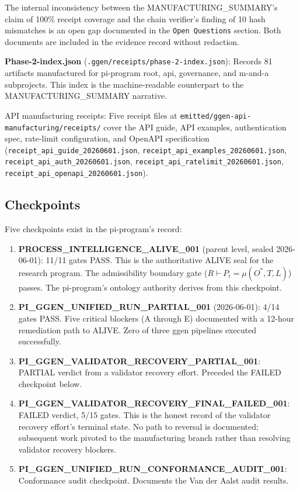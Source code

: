 The internal inconsistency between the MANUFACTURING\_SUMMARY's claim of 100\% receipt coverage and the chain verifier's finding of 10 hash mismatches is an open gap documented in the \texttt{Open Questions} section. Both documents are included in the evidence record without redaction.

\textbf{Phase-2-index.json} (\texttt{.ggen/receipts/phase-2-index.json}): Records 81 artifacts manufactured for pi-program root, api, governance, and m-and-a subprojects. This index is the machine-readable counterpart to the MANUFACTURING\_SUMMARY narrative.

API manufacturing receipts: Five receipt files at \texttt{emitted/ggen-api-manufacturing/receipts/} cover the API guide, API examples, authentication spec, rate-limit configuration, and OpenAPI specification (\texttt{receipt\_api\_guide\_20260601.json}, \texttt{receipt\_api\_examples\_20260601.json}, \texttt{receipt\_api\_auth\_20260601.json}, \texttt{receipt\_api\_ratelimit\_20260601.json}, \texttt{receipt\_api\_openapi\_20260601.json}).

\subsection{Checkpoints}
\label{sec:research-pi-program-evidence-checkpoints}

Five checkpoints exist in the pi-program's record:

\begin{enumerate}
  \item \textbf{PROCESS\_INTELLIGENCE\_ALIVE\_001} (parent level, sealed 2026-06-01): 11/11 gates PASS. This is the authoritative ALIVE seal for the research program. The admissibility boundary gate ($R \vdash P_i = \mu(O^{*}, T, L)$) passes. The pi-program's ontology authority derives from this checkpoint.
  \item \textbf{PI\_GGEN\_UNIFIED\_RUN\_PARTIAL\_001} (2026-06-01): 4/14 gates PASS. Five critical blockers (A through E) documented with a 12-hour remediation path to ALIVE. Zero of three ggen pipelines executed successfully.
  \item \textbf{PI\_GGEN\_VALIDATOR\_RECOVERY\_PARTIAL\_001}: PARTIAL verdict from a validator recovery effort. Preceded the FAILED checkpoint below.
  \item \textbf{PI\_GGEN\_VALIDATOR\_RECOVERY\_FINAL\_FAILED\_001}: FAILED verdict, 5/15 gates. This is the honest record of the validator recovery effort's terminal state. No path to reversal is documented; subsequent work pivoted to the manufacturing branch rather than resolving validator recovery blockers.
  \item \textbf{PI\_GGEN\_UNIFIED\_RUN\_CONFORMANCE\_AUDIT\_001}: Conformance audit checkpoint. Documents the Van der Aalst audit results.
\end{enumerate}

